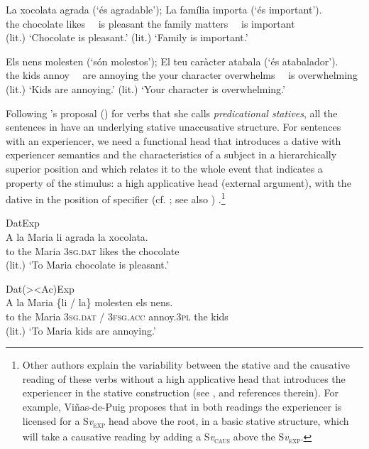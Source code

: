 \documentclass[output=paper,colorlinks,citecolor=brown,modfonts,nonflat]{langsci/langscibook}
\begin{document}
\ea%
 \label{ex:royo:18}
 \ea \label{ex:royo:18a}
 \gll La xocolata agrada (‘és agradable’); La família importa (‘és important’). \\
 the chocolate likes ~~is pleasant the family matters ~~is important\\
 \glt (lit.) ‘Chocolate is pleasant.’ (lit.) ‘Family is important.’

 \ex \label{ex:royo:18b}
 \gll Els nens molesten (‘són molestos’); El teu caràcter atabala (‘és atabalador’).\\
  the kids annoy ~~are annoying the your character overwhelms ~~is overwhelming\\
 \glt  (lit.) ‘Kids are annoying.’ (lit.) ‘Your character is overwhelming.’

 \z
 \z

Following \citeauthor{Cuervo2003}'s proposal (\citeyear[Section 1.3.3.2]{Cuervo2003}) for verbs that she calls \textit{predicational statives}, all the sentences in  have an underlying stative unaccusative structure. For sentences with an experiencer, we need a functional head that introduces a dative with experiencer semantics and the characteristics of a subject in a hierarchically superior position and which relates it to the whole event that indicates a property of the stimulus: a high applicative head (external argument), with the dative in the position of specifier (cf. \citealt{Pylkkänen2008, Cuervo2003, Cuervo2010Cuestiones}; see also ) .\footnote{Other authors explain the variability between the stative and the causative reading of these verbs without a high applicative head that introduces the experiencer in the stative construction (see \citealt{Viñas-de-Puig2014, Viñas-de-Puig2017}, and references therein). For example, Viñas-de-Puig proposes that in both readings the experiencer is licensed for a S\textit{v}\textsc{\textsubscript{exp}} head above the root, in a basic stative structure, which will take a causative reading by adding a S\textit{v}\textsc{\textsubscript{caus}} above the S\textit{v}\textsc{\textsubscript{exp}}.}


\ea%
 \label{ex:royo:19}
 \ea DatExp\label{ex:royo:19a}\\
 \gll A la Maria li agrada la xocolata. \\
 to the Maria \textsc{3sg.dat} likes the chocolate\\
 \glt (lit.) ‘To Maria chocolate is pleasant.’

 \ex  Dat(>{\textbar}<Ac)Exp\label{ex:royo:19b}\\
 \gll A la Maria \{li / la\} molesten els nens.\\
 to the Maria \textsc{3sg.dat} / \textsc{3fsg.acc} annoy.\textsc{3pl} the kids\\
 \glt (lit.) ‘To Maria kids are annoying.’
\end{document}

